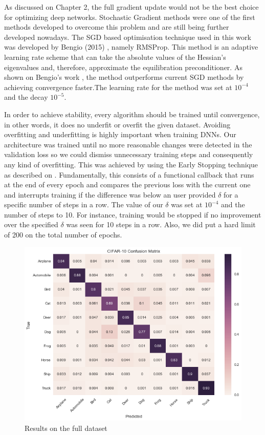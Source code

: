 As discussed on Chapter 2, the full gradient update would not be the best choice for optimizing deep networks. Stochastic Gradient methods were one of the first methods developed to overcome this problem and are still being further developed nowadays. The SGD based optimisation technique used in this work was developed by Bengio (2015) \cite{bengiormsprop}, namely RMSProp. This method is an adaptive learning rate scheme that can take the absolute values of the Hessian's eigenvalues and, therefore, approximate the equilibration preconditioner. As shown on Bengio's work \cite{bengiormsprop}, the method outperforms current SGD methods by achieving convergence faster.The learning rate for the method was set at $10^{-4}$ and the decay $10^{-5}$.

In order to achieve stability, every algorithm should be trained until convergence, in other words, it does no underfit or overfit the given dataset. Avoiding overfitting and underfitting is highly important when training DNNs. Our architecture was trained until no more reasonable changes were detected in the validation loss so we could dismiss unnecessary training steps and consequently any kind of overfitting. This was achieved by using the Early Stopping technique as described on \cite{stanford2016}. Fundamentally, this consists of a functional callback that runs at the end of every epoch and compares the previous loss with the current one and interrupts training if the difference was below an user provided $\delta$ for a specific number of steps in a row. The value of our $\delta$ was set at $10^{-4}$ and the number of steps to 10. For instance, training would be stopped if no improvement over the specified $\delta$ was seen for 10 steps in a row. Also, we did put a hard limit of 200 on the total number of epochs.

\begin{figure}[!h]
	\centering
	\includegraphics[scale=0.6]{conf_matrix.png}
	\caption{Results on the full dataset}
	\label{fig:conf_matrix_full}
\end{figure}

